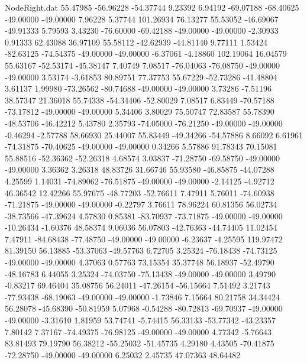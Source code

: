\begin{filecontents}{NodeRight.dat}
  55.47985  -56.96228  -54.37744     9.23392    6.94192  -69.07188  -68.40625  -49.00000  -49.00000    7.96228    5.37744  101.26934   76.13277
  55.53052  -46.69067  -49.91333     5.79593    3.43230  -76.60000  -69.42188  -49.00000  -49.00000   -2.30933    0.91333   62.43088   36.97109
  55.58112  -42.62939  -44.81140     9.77111    1.53424  -82.63125  -74.54375  -49.00000  -49.00000   -6.37061   -4.18860  102.19064   16.04579
  55.63167  -52.53174  -45.38147     7.40749    7.08517  -76.04063  -76.08750  -49.00000  -49.00000    3.53174   -3.61853   80.89751   77.37753
  55.67229  -52.73286  -41.48804     3.61137    1.99980  -73.26562  -80.74688  -49.00000  -49.00000    3.73286   -7.51196   38.57347   21.36018
  55.74338  -54.34406  -52.80029     7.08517    6.83449  -70.57188  -73.17812  -49.00000  -49.00000    5.34406    3.80029   75.50747   72.83587
  55.78390  -48.53706  -46.42212     5.43780    2.35793  -74.05000  -76.21250  -49.00000  -49.00000   -0.46294   -2.57788   58.66930   25.44007
  55.83449  -49.34266  -54.57886     8.66092    6.61961  -74.31875  -70.40625  -49.00000  -49.00000    0.34266    5.57886   91.78343   70.15081
  55.88516  -52.36362  -52.26318     4.68574    3.03837  -71.28750  -69.58750  -49.00000  -49.00000    3.36362    3.26318   48.83726   31.66746
  55.93580  -46.85875  -44.07288     4.25599    1.14031  -74.89062  -76.51875  -49.00000  -49.00000   -2.14125   -4.92712   46.36542   12.42266
  55.97675  -48.77203  -52.76611     7.47911    5.76011  -74.60938  -71.21875  -49.00000  -49.00000   -0.22797    3.76611   78.96224   60.81356
  56.02734  -38.73566  -47.39624     4.57830    0.85381  -83.70937  -73.71875  -49.00000  -49.00000  -10.26434   -1.60376   48.58374    9.06036
  56.07803  -42.76363  -44.74405    11.02454    7.47911  -84.68438  -77.48750  -49.00000  -49.00000   -6.23637   -4.25595  119.97472   81.39150
  56.13885  -53.37063  -49.57763     6.72705    3.25324  -76.18438  -74.73125  -49.00000  -49.00000    4.37063    0.57763   73.15354   35.37748
  56.18937  -52.49790  -48.16783     6.44055    3.25324  -74.03750  -75.13438  -49.00000  -49.00000    3.49790   -0.83217   69.46404   35.08756
  56.24011  -47.26154  -56.15664     7.51492    3.21743  -77.93438  -68.19063  -49.00000  -49.00000   -1.73846    7.15664   80.21758   34.34424
  56.28078  -45.68390  -50.81959     5.07968   -0.54288  -80.72813  -69.70937  -49.00000  -49.00000   -3.31610    1.81959   53.74741   -5.74415
  56.33133  -53.77342  -43.23357     7.80142    7.37167  -74.49375  -76.98125  -49.00000  -49.00000    4.77342   -5.76643   83.81493   79.19790
  56.38212  -55.25032  -51.45735     4.29180    4.43505  -70.41875  -72.28750  -49.00000  -49.00000    6.25032    2.45735   47.07363   48.64482

\end{filecontents}
